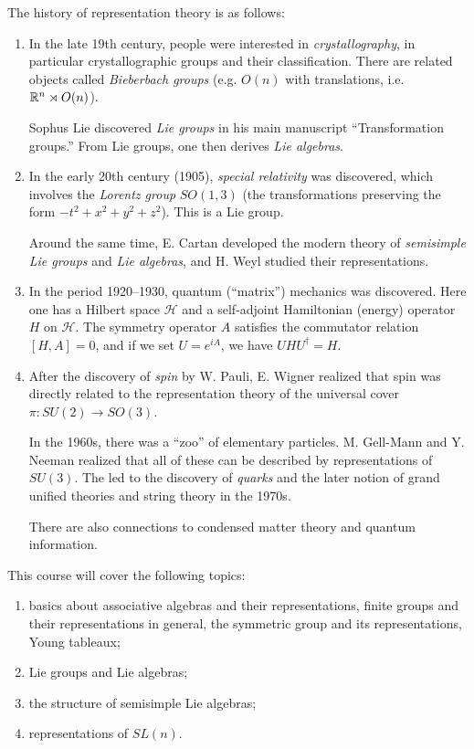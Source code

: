 The history of representation theory is as
follows:
\begin{enumerate}
    \item
    In the late 19th century, people
    were interested in \emph{crystallography},
    in particular crystallographic groups
    and their classification. There are
    related objects called \emph{Bieberbach groups} (e.g. $O(n)$ with translations, i.e.
    $\mathbb{R}^n \rtimes O(n)$).

    Sophus Lie discovered \emph{Lie groups}
    in his main manuscript ``Transformation
    groups.'' From Lie groups, one then derives
    \emph{Lie algebras}.

    \item
    In the early 20th century (1905),
    \emph{special relativity} was discovered,
    which involves the \emph{Lorentz group}
    $SO(1, 3)$ (the transformations preserving
    the form $-t^2 + x^2 + y^2 + z^2$).
    This is a Lie group.

    Around the same time, E. Cartan developed
  the modern theory of \emph{semisimple Lie groups} and \emph{Lie algebras}, and
    H. Weyl studied their representations.

    \item
    In the period 1920--1930, quantum (``matrix'')
    mechanics was discovered. Here
    one has a Hilbert space $\mathcal{H}$ and
    a self-adjoint Hamiltonian (energy)
    operator $H$ on $\mathcal{H}$.
    The symmetry operator $A$ satisfies
    the commutator relation
    $[H, A] = 0$, and if we set $U = e^{iA}$,
    we have $U H U^\dagger = H$.

    \item
    After the discovery of \emph{spin} by W.
    Pauli, E. Wigner realized that spin was
    directly related to the representation
    theory of the universal cover
    $\pi : SU(2) \to SO(3)$.

    In the 1960s, there was a ``zoo'' of
    elementary particles. M. Gell-Mann and
    Y. Neeman realized that all of these
    can be described by representations of
    $SU(3)$. The led to the discovery of
    \emph{quarks} and the later
    notion of grand unified theories and
    string theory in the 1970s.

    There are also connections to condensed
    matter theory and quantum information.
\end{enumerate}

This course will cover the following topics:
\begin{enumerate}
  \item basics about associative algebras
    and their representations, finite groups
    and their representations in general,
    the symmetric group and its representations,
    Young tableaux;
  \item Lie groups and Lie algebras;
  \item the structure of semisimple Lie
    algebras;
  \item representations of $SL(n)$.
\end{enumerate}

